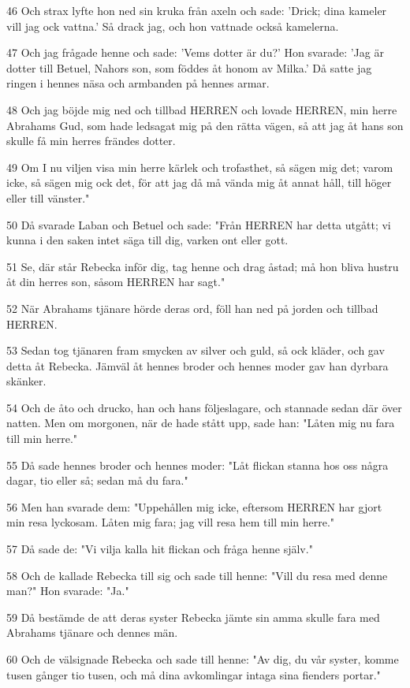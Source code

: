 \par 46 Och strax lyfte hon ned sin kruka från axeln och sade: 'Drick; dina kameler vill jag ock vattna.' Så drack jag, och hon vattnade också kamelerna.
\par 47 Och jag frågade henne och sade: 'Vems dotter är du?' Hon svarade: 'Jag är dotter till Betuel, Nahors son, som föddes åt honom av Milka.' Då satte jag ringen i hennes näsa och armbanden på hennes armar.
\par 48 Och jag böjde mig ned och tillbad HERREN och lovade HERREN, min herre Abrahams Gud, som hade ledsagat mig på den rätta vägen, så att jag åt hans son skulle få min herres frändes dotter.
\par 49 Om I nu viljen visa min herre kärlek och trofasthet, så sägen mig det; varom icke, så sägen mig ock det, för att jag då må vända mig åt annat håll, till höger eller till vänster."
\par 50 Då svarade Laban och Betuel och sade: "Från HERREN har detta utgått; vi kunna i den saken intet säga till dig, varken ont eller gott.
\par 51 Se, där står Rebecka inför dig, tag henne och drag åstad; må hon bliva hustru åt din herres son, såsom HERREN har sagt."
\par 52 När Abrahams tjänare hörde deras ord, föll han ned på jorden och tillbad HERREN.
\par 53 Sedan tog tjänaren fram smycken av silver och guld, så ock kläder, och gav detta åt Rebecka. Jämväl åt hennes broder och hennes moder gav han dyrbara skänker.
\par 54 Och de åto och drucko, han och hans följeslagare, och stannade sedan där över natten. Men om morgonen, när de hade stått upp, sade han: "Låten mig nu fara till min herre."
\par 55 Då sade hennes broder och hennes moder: "Låt flickan stanna hos oss några dagar, tio eller så; sedan må du fara."
\par 56 Men han svarade dem: "Uppehållen mig icke, eftersom HERREN har gjort min resa lyckosam. Låten mig fara; jag vill resa hem till min herre."
\par 57 Då sade de: "Vi vilja kalla hit flickan och fråga henne själv."
\par 58 Och de kallade Rebecka till sig och sade till henne: "Vill du resa med denne man?" Hon svarade: "Ja."
\par 59 Då bestämde de att deras syster Rebecka jämte sin amma skulle fara med Abrahams tjänare och dennes män.
\par 60 Och de välsignade Rebecka och sade till henne: "Av dig, du vår syster, komme tusen gånger tio tusen, och må dina avkomlingar intaga sina fienders portar."
